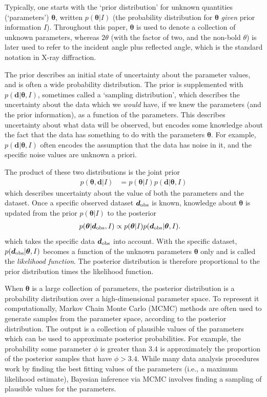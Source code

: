 \documentclass[preprint, a4paper]{elsarticle}
\newcommand{\params}{\boldsymbol{\theta}}
\newcommand{\data}{\boldsymbol{d}}
\newcommand{\info}{I}
\begin{document}
Typically, one starts with the `prior distribution'
for unknown quantities (`parameters') $\params$, written $p(\params | \info)$
(the probability distribution for $\params$ {\em given} prior information
$\info$). Throughout this paper, $\params$ is used to denote a
collection of unknown parameters, whereas $2\theta$ (with the factor of two, and the
non-bold $\theta$) is later used to
refer to the incident angle plus reflected angle, which is the
standard notation in X-ray diffraction. 

The prior describes an initial state of uncertainty about the
parameter values, and is often a wide probability distribution.
The prior is supplemented with $p(\data | \params, \info)$, sometimes
called a `sampling distribution',
which describes the uncertainty about the data which we {\em would} have,
if we knew the parameters (and the prior information), as a function of
the parameters. This describes uncertainty about what data will be observed,
but encodes some knowledge about the fact that the data has something to do with the
parameters $\params$. For example, $p(\data | \params, \info)$ often encodes
the assumption that the data has noise in it, and the specific noise values
are unknown a priori.

The
product of these two distributions is the joint prior
\begin{align}
p(\params, \data | \info) &= p(\params | \info)p(\data | \params, \info)
\end{align}
which describes uncertainty about the value of both the parameters and the
dataset. Once a specific observed dataset $\data_{\rm obs}$ is known, knowledge about
$\params$ is updated from the prior $p(\params | \info)$ to the posterior
\begin{align}
p(\params | \data_{\rm obs}, \info) &\propto
    p(\params | \info)p(\data_{\rm obs} | \params, \info).
\end{align}
which takes the specific data $\data_{\rm obs}$ into account. With the specific dataset,
$p(\data_{\rm obs} | \params,\info)$ becomes a function of the
unknown parameters $\params$ only and is called the {\em likelihood function}.
The posterior distribution is therefore proportional to the prior distribution
times the likelihood function.

When $\params$ is a large collection of parameters, the posterior distribution
is a probability distribution over a high-dimensional parameter space. To
represent it computationally, Markov Chain Monte Carlo (MCMC) methods are
often used to generate samples from the parameter space, according to the
posterior distribution. The output is a collection of plausible values of the
parameters which can be used to approximate posterior probabilities.
For example, the probability some parameter $\phi$ is greater than 3.4
is approximately the proportion of the posterior samples that have
$\phi > 3.4$. While many data analysis procedures work by finding the
best fitting values of the parameters (i.e., a maximum likelihood estimate),
Bayesian inference via MCMC involves finding a sampling of plausible values
for the parameters.
\end{document}
